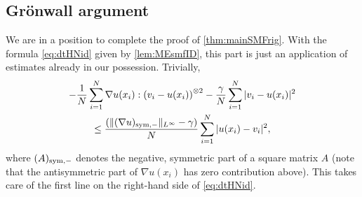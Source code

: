 \documentclass[JEP,XML,SOM,Unicode,published]{cedram}
\newcommand{\sym}{\textup{sym}}
\theoremstyle{plain}
\theoremstyle{definition}
\DeclarePairedDelimiter{\pa}{\lparen}{\rparen}
\let\ga\gamma
\let\nab\nabla
\begin{document}
\subsection{Grönwall argument}\label{ssec:MPgron}
We are in a position to complete the proof of \cref{thm:mainSMFrig}. With the formula \eqref{eq:dtHNid} given by \cref{lem:MEsmfID}, this part is just an application of estimates already in our possession.
Trivially,\vspace*{-8pt}
\begin{multline}\label{eq:LGronkin}
-\frac{1}{N}\sum_{i=1}^N \nab u(x_i) : \pa*{v_i - u(x_i)}^{\otimes 2} -\frac{\ga}{N}\sum_{i=1}^N |v_i-u(x_i)|^2 \\
\leq \frac{(\|(\nabla u)_{\sym,-}\|_{L^\infty}-\ga)}{N}\sum_{i=1}^N |u(x_i)-v_i|^2,
\end{multline}
where $(A)_{\sym,-}$ denotes the negative, symmetric part of a square matrix $A$ (note that the antisymmetric part of $\nab u(x_i)$ has zero contribution above). This takes care of the first line on the right-hand side of \eqref{eq:dtHNid}.
\end{document}
